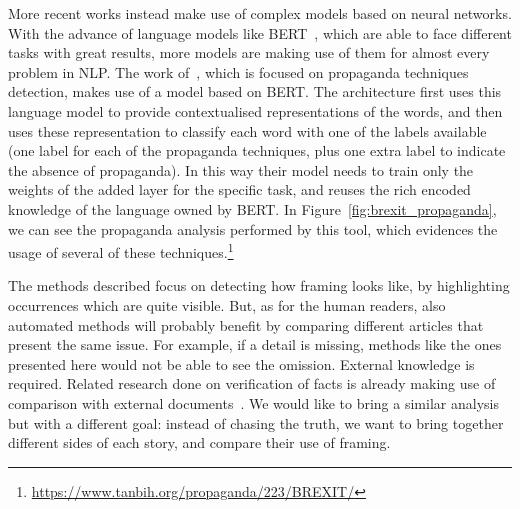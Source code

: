 More recent works instead make use of complex models based on neural networks. With the advance of language models like BERT~\cite{devlin2018bert}, which are able to face different tasks with great results, more models are making use of them for almost every problem in NLP.
The work of~\citet{da2019fine}, which is focused on propaganda techniques detection, makes use of a model based on BERT.
The architecture first uses this language model to provide contextualised representations of the words, and then uses these representation to classify each word with one of the labels available (one label for each of the propaganda techniques, plus one extra label to indicate the absence of propaganda).
In this way their model needs to train only the weights of the added layer for the specific task, and reuses the rich encoded knowledge of the language owned by BERT.
In Figure~\ref{fig:brexit_propaganda}, we can see the propaganda analysis performed by this tool, which evidences the usage of several of these techniques.\footnote{\url{https://www.tanbih.org/propaganda/223/BREXIT/}}

The methods described focus on detecting how framing looks like, by highlighting occurrences which are quite visible.
But, as for the human readers, also automated methods will probably benefit by comparing different articles that present the same issue.
For example, if a detail is missing, methods like the ones presented here would not be able to see the omission.
External knowledge is required.
Related research done on verification of facts is already making use of comparison with external documents~\cite{yin2008truth,karadzhov2017fully}.
We would like to bring a similar analysis but with a different goal: instead of chasing the truth, we want to bring together different sides of each story, and compare their use of framing. 









